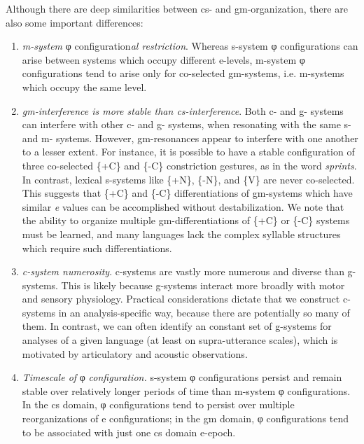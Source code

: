 Although there are deep similarities between cs- and gm-organization, there are also some important differences: 

\begin{enumerate}
\item \textit{m-system} φ configuration\textit{al restriction}. Whereas s-system φ configurations can arise between systems which occupy different e-levels, m-system φ configurations tend to arise only for co-selected gm-systems, i.e. m-systems which occupy the same level. 

\item \textit{gm-interference is more stable than cs-interference}. Both c- and g- systems can interfere with other c- and g- systems, when resonating with the same s- and m- systems. However, gm-resonances appear to interfere with one another to a lesser extent. For instance, it is possible to have a stable configuration of three co-selected \{+C\} and \{-C\} constriction gestures, as in the word \textit{sprints}. In contrast, lexical s-systems like \{+N\}, \{-N\}, and \{V\} are never co-selected. This suggests that \{+C\} and \{-C\} differentiations of gm-systems which have similar \textit{e} values can be accomplished without destabilization. We note that the ability to organize multiple gm-differentiations of \{+C\} or \{-C\} systems must be learned, and many languages lack the complex syllable structures which require such differentiations.

\item \textit{c-system numerosity}. c-systems are vastly more numerous and diverse than g-systems. This is likely because g-systems interact more broadly with motor and sensory physiology. Practical considerations dictate that we construct c-systems in an analysis-specific way, because there are potentially so many of them. In contrast, we can often identify an constant set of g-systems for analyses of a given language (at least on supra-utterance scales), which is motivated  by articulatory and acoustic observations.

\item  \textit{Timescale of} φ \textit{configuration.} s-system φ configurations persist and remain stable over relatively longer periods of time than m-system φ configurations. In the cs domain, φ configurations tend to persist over multiple reorganizations of e configurations; in the gm domain, φ configurations tend to be associated with just one cs domain e-epoch.
\end{enumerate}

